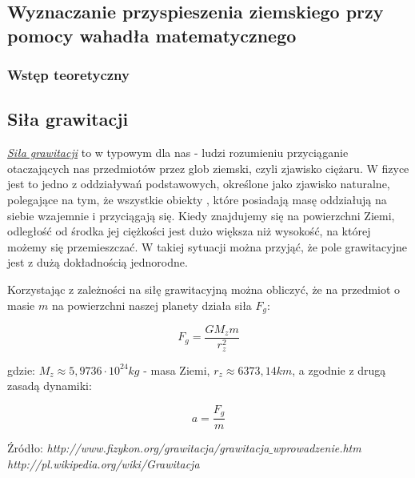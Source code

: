\documentclass{article}
\begin{document}
\begin{small}

\begin{center}
\section*{Wyznaczanie przyspieszenia ziemskiego przy pomocy wahadła matematycznego}
\subsubsection*{Wstęp teoretyczny}
\end{center}
\subsection*{Siła grawitacji} 

\textit{\underline{Siła grawitacji}} to w typowym dla nas - ludzi rozumieniu przyciąganie otaczających nas przedmiotów przez glob ziemski, czyli zjawisko ciężaru. W fizyce jest to jedno z oddziaływań podstawowych, określone jako zjawisko naturalne, polegające na tym, że wszystkie obiekty , które posiadają masę oddziałują na siebie wzajemnie i przyciągają się. Kiedy znajdujemy się na powierzchni Ziemi, odległość od środka jej ciężkości jest dużo większa niż wysokość, na której możemy się przemieszczać. W takiej sytuacji można przyjąć, że pole grawitacyjne jest z dużą dokładnością jednorodne. 

Korzystając z zależności na siłę grawitacyjną można obliczyć, że na przedmiot o masie $m$ na powierzchni naszej planety działa siła $F_g$: 
\begin{Large}
$$F_g=\frac{GM_z m}{r_z^2}$$
\end{Large}
\begin{small}
gdzie: $M_z \approx 5,9736 \cdot 10^{24} kg$ - masa Ziemi, $r_z \approx 6373,14 km$, a zgodnie z drugą zasadą dynamiki:
\end{small}
\begin{Large}
$$a=\frac{F_g}{m}$$
\end{Large}
\begin{flushright}
\begin{scriptsize}
Źródło: \textit{http://www.fizykon.org/grawitacja/grawitacja$\_$wprowadzenie.htm} \\
\textit{http://pl.wikipedia.org/wiki/Grawitacja}
\end{scriptsize}
\end{flushright}

\end{small}
\end{document}
